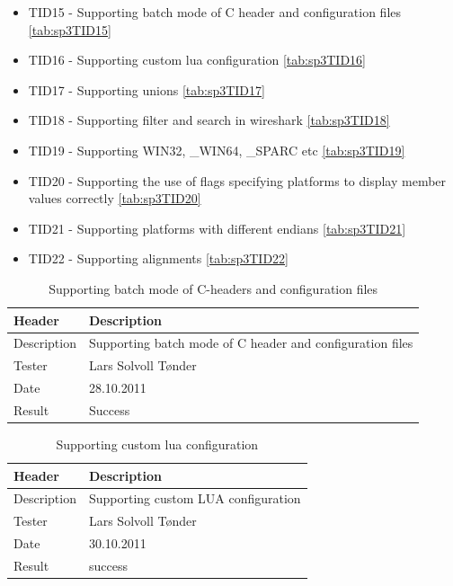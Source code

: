 \begin{itemize}
	\item TID15 - Supporting batch mode of C header and configuration files \autoref{tab:sp3TID15}
	\item TID16 - Supporting custom \Gls{lua} configuration \autoref{tab:sp3TID16}
	\item TID17 - Supporting unions \autoref{tab:sp3TID17}
	\item TID18 - Supporting filter and search in wireshark \autoref{tab:sp3TID18}
	\item TID19 - Supporting WIN32, \_WIN64, \_SPARC etc \autoref{tab:sp3TID19}
	\item TID20 -  Supporting the use of flags specifying platforms to display member values correctly \autoref{tab:sp3TID20}
	\item TID21 - Supporting platforms with different \glspl{endian} \autoref{tab:sp3TID21}
	\item TID22 - Supporting alignments \autoref{tab:sp3TID22}
\end{itemize}

\begin{table}[!htb] \footnotesize \center
\caption{Supporting batch mode of C-headers and configuration files\label{tab:sp3TID15}}
\begin{tabular}{l l}
	\toprule
	Header & Description \\
	\midrule
	Description & Supporting batch mode of C header and configuration files \\
	Tester & Lars Solvoll Tønder \\
	Date & 28.10.2011 \\
	Result & Success\\
	\bottomrule
\end{tabular}
\end{table}

\begin{table}[!htb] \footnotesize \center
\caption{Supporting custom \Gls{lua} configuration\label{tab:sp3TID16}}
\begin{tabular}{l l}
	\toprule
	Header & Description \\
	\midrule
	Description & Supporting custom LUA configuration\\
	Tester & Lars Solvoll Tønder \\
	Date & 30.10.2011\\
	Result & success\\
	\bottomrule
\end{tabular}
\end{table}

